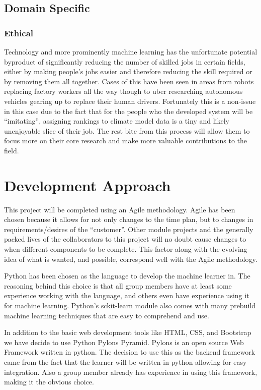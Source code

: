 \documentclass{ecmm427_assignment}
\begin{document}
\subsection{Domain Specific}

\subsubsection{Ethical}

Technology and more prominently machine learning has the unfortunate
potential byproduct of significantly reducing the number of skilled
jobs in certain fields, either by making people's jobs easier and
therefore reducing the skill required or by removing them all together.
Cases of this have been seen in areas from robots replacing factory
workers all the way though to uber researching autonomous vehicles
gearing up to replace their human drivers. Fortunately this is a non-issue
in this case due to the fact that for the people who the developed
system will be ``imitating'', assigning rankings to climate model
data is a tiny and likely unenjoyable slice of their job. The rest bite
from this process will allow them to focus more on their core research
and make more valuable contributions to the field. 



\section{Development Approach}
\quad This project will be completed using an Agile methodology. Agile has been chosen because it allows for not only changes to the time plan, but to changes in requirements/desires of the “customer”. Other module projects and the generally packed lives of the collaborators to this project will no doubt cause changes to when different components to be complete. This factor along with the evolving idea of what is wanted, and possible, correspond well with the Agile methodology.\par

\quad Python has been chosen as the language to develop the machine learner in. The reasoning behind this choice is that all group members have at least some experience working with the language, and others even have experience using it for machine learning. Python’s sckit-learn module also comes with many prebuild machine learning techniques that are easy to comprehend and use.\par

\quad In addition to the basic web development tools like HTML, CSS, and Bootstrap we have decide to use Python Pylons Pyramid. Pylons is an open source Web Framework written in python. The decision to use this as the backend framework came from the fact that the learner will be written in python allowing for easy integration. Also a group member already has experience in using this framework, making it the obvious choice.\par
\end{document}
